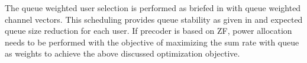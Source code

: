 The queue weighted user selection is performed as briefed in \cite{sus2006zfbf,sun2009eigenmode} with queue weighted channel vectors. This scheduling provides queue stability as given in \cite{neely2012stability} and expected queue size reduction for each user. If precoder is based on ZF, power allocation needs to be performed with the objective of maximizing the sum rate with queue as weights to achieve the above discussed optimization objective.
 